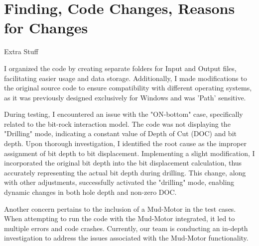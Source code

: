 \section{Finding, Code Changes, Reasons for Changes}
 
 Extra Stuff
 

 
I organized the code by creating separate folders for Input and Output files, facilitating easier usage and data storage. Additionally, I made modifications to the original source code to ensure compatibility with different operating systems, as it was previously designed exclusively for Windows and was 'Path' sensitive.

During testing, I encountered an issue with the "ON-bottom" case, specifically related to the bit-rock interaction model. The code was not displaying the "Drilling" mode, indicating a constant value of Depth of Cut (DOC) and bit depth. Upon thorough investigation, I identified the root cause as the improper assignment of bit depth to bit displacement. Implementing a slight modification, I incorporated the original bit depth into the bit displacement calculation, thus accurately representing the actual bit depth during drilling. This change, along with other adjustments, successfully activated the "drilling" mode, enabling dynamic changes in both hole depth and non-zero DOC.

Another concern pertains to the inclusion of a Mud-Motor in the test cases. When attempting to run the code with the Mud-Motor integrated, it led to multiple errors and code crashes. Currently, our team is conducting an in-depth investigation to address the issues associated with the Mud-Motor functionality. 